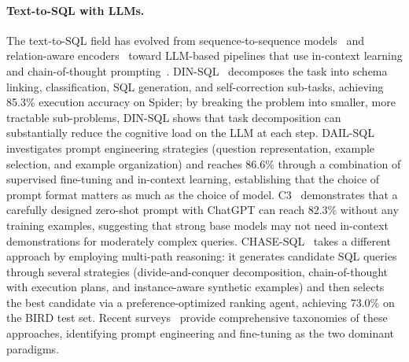 \documentclass{article}
\begin{document}
\paragraph{Text-to-SQL with LLMs.}
The text-to-SQL field has evolved from sequence-to-sequence models~\citep{zhong2017seq2sql} and relation-aware encoders~\citep{wang2020ratsql} toward LLM-based pipelines that use in-context learning and chain-of-thought prompting~\citep{brown2020language, wei2022chain}. DIN-SQL~\citep{pourreza2023dinsql} decomposes the task into schema linking, classification, SQL generation, and self-correction sub-tasks, achieving 85.3\% execution accuracy on Spider; by breaking the problem into smaller, more tractable sub-problems, DIN-SQL shows that task decomposition can substantially reduce the cognitive load on the LLM at each step. DAIL-SQL~\citep{gao2024dailsql} investigates prompt engineering strategies (question representation, example selection, and example organization) and reaches 86.6\% through a combination of supervised fine-tuning and in-context learning, establishing that the choice of prompt format matters as much as the choice of model. C3~\citep{dong2023c3} demonstrates that a carefully designed zero-shot prompt with ChatGPT can reach 82.3\% without any training examples, suggesting that strong base models may not need in-context demonstrations for moderately complex queries. CHASE-SQL~\citep{chasesql2024} takes a different approach by employing multi-path reasoning: it generates candidate SQL queries through several strategies (divide-and-conquer decomposition, chain-of-thought with execution plans, and instance-aware synthetic examples) and then selects the best candidate via a preference-optimized ranking agent, achieving 73.0\% on the BIRD test set. Recent surveys~\citep{shi2024survey, hong2024nextgen} provide comprehensive taxonomies of these approaches, identifying prompt engineering and fine-tuning as the two dominant paradigms.
\end{document}
